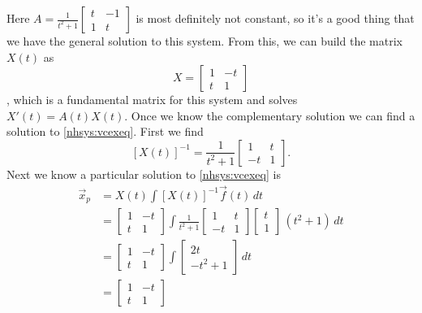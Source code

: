 \begin{exampleSol}
Here $A = 
\frac{1}{t^2+1}
\left[ \begin{smallmatrix}
t & -1 \\
1 & t
\end{smallmatrix} \right]$ is most definitely not constant, so it's a good thing that we have the general solution to this system. From this, we can build the matrix $X(t)$ as 
\begin{equation*}
X = 
\begin{bmatrix}
1 & -t \\
t & 1
\end{bmatrix}
\end{equation*}, which is a fundamental matrix for this system and solves
$X'(t) = A(t) X(t)$.  Once we know the complementary solution we can find
a solution to \eqref{nhsys:vcexeq}.  First we find
\begin{equation*}
\left[ X(t) \right]^{-1}
=
\frac{1}{t^2+1}
\begin{bmatrix}
1 & t \\
-t & 1
\end{bmatrix} .
\end{equation*}
Next we know a particular solution to
\eqref{nhsys:vcexeq} is
\begin{equation*}
\begin{split}
\vec{x}_p & = 
X(t)
\int \left[X(t)\right]^{-1}\vec{f}(t) \, dt 
\\
& =
\begin{bmatrix}
1 & -t \\
t & 1
\end{bmatrix} 
\int
\frac{1}{t^2+1}
\begin{bmatrix}
1 & t \\
-t & 1
\end{bmatrix}
\begin{bmatrix} t \\ 1 \end{bmatrix} \,(t^2+1) 
\,dt
\\
& =
\begin{bmatrix}
1 & -t \\
t & 1
\end{bmatrix} 
\int
\begin{bmatrix}
2t \\
-t^2 + 1
\end{bmatrix} 
\,dt
\\
& =
\begin{bmatrix}
1 & -t \\
t & 1
\end{bmatrix} 

\end{split}
\end{equation*}
\end{exampleSol}
